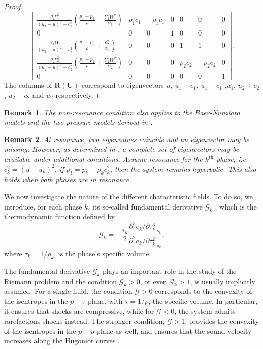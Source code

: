 \documentclass{myclass}
\newtheorem{remark}{\bf Remark}[section]
\newcommand{\mtrx}[1]{\mathbf{#1}}
\newcommand{\pth}[1]  {\left( #1 \right)}
\begin{document}
\begin{proof}
\begin{equation}
\begin{bmatrix}
\tfrac{\rho_1 c_1^2}{(u_1-u)^2-c_1^2}\pth{\tfrac{p_1-p_2}{\rho} - \tfrac{Y_2^2 W^2}{\alpha_1}} & \rho_1 c_1 & -\rho_1 c_1 & 0 & 0 & 0 & 0 \\
0 & 0 & 0 & 1 & 0 & 0 & 0\\
\tfrac{Y_1 W}{(u_2-u)^2-c_2^2}\pth{\tfrac{p_1-p_2}{\rho} + \tfrac{c_2^2}{\alpha_2}} & 0 & 0 & 0 & 1 & 1 & 0\\
\tfrac{\rho_2 c_2^2}{(u_2-u)^2-c_2^2}\pth{\tfrac{p_1-p_2}{\rho} + \tfrac{Y_1^2 W^2}{\alpha_2}}  & 0 & 0 & 0 & \rho_2 c_2 & -\rho_2 c_2 & 0\\
0 & 0 & 0 & 0 & 0 & 0 & 1
\end{bmatrix}.
\end{equation} 
The columns of $\mtrx{R}(\bm{U})$ correspond to eigenvectors $u$, $u_1+c_1$, $u_1-c_1$ ,$u_1$, $u_2+c_2$, $u_2-c_2$ and $u_2$  respectively.
\end{proof}

\begin{remark}
The non-resonance condition also applies to the Baer-Nunziato models \cite{gallouet:2004} and the two-pressure models derived in \cite{ransom:1984}.
\end{remark}
 
\begin{remark}
At resonance, two eigenvalues coincide and an eigenvector may be missing. However, as determined in \cite{ransom:1984}, a complete set of eigenvectors may be available under additional conditions. Assume resonance for the $k^\text{th}$ phase, i.e. $c_k^2=(u-u_k)^2$, if $p_I = p_k - \rho_k c_k^2$, then the system remains hyperbolic. This also holds when both phases are in resonance.
\end{remark}

We now investigate the nature of the different characteristic fields. To do so, we introduce, for each phase $k$, its so-called fundamental derivative $\mathcal{G}_k$ \cite{menikoff:1989}, which is the thermodynamic function defined by
\begin{equation}
\mathcal{G}_k = -\frac{\tau_k}{2}\frac{\partial^3 e_k / \partial{\tau_k^3}_{|s_k}}{\partial^2 e_k / \partial{\tau_k^2}_{|s_k}},
\end{equation}
where $\tau_k=1/\rho_k$, is the phase's specific volume.

The fundamental derivative $\mathcal{G}_k$ plays an important role in the study of the Riemann problem and the condition $\mathcal{G}_k>0$, or even $\mathcal{G}_k>1$, is usually implicitly assumed. For a single fluid, the condition $\mathcal{G}>0$ corresponds to the convexity of the isentropes in the $p-\tau$ plane, with $\tau=1/\rho$, the specific volume. In particular, it ensures that shocks are compressive, while for $\mathcal{G}<0$, the system admits rarefactions shocks instead. The stronger condition, $\mathcal{G}>1$, provides the convexity of the isentropes in the $p-\rho$ plane as well, and ensures that the sound velocity increases along the Hugoniot curves \cite{thompson:1971,menikoff:1989}.
 
\end{document}
